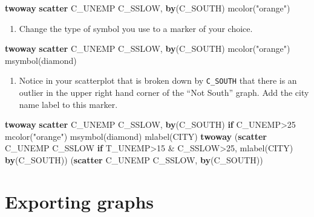 \documentclass[
]{book}
\newenvironment{Shaded}{\begin{snugshade}}{\end{snugshade}}
\newcommand{\BaseNTok}[1]{\textcolor[rgb]{0.00,0.00,0.81}{#1}}
\newcommand{\KeywordTok}[1]{\textcolor[rgb]{0.13,0.29,0.53}{\textbf{#1}}}
\newcommand{\NormalTok}[1]{#1}
\newcommand{\StringTok}[1]{\textcolor[rgb]{0.31,0.60,0.02}{#1}}
\providecommand{\tightlist}{%
  \setlength{\itemsep}{0pt}\setlength{\parskip}{0pt}}
\begin{document}
\begin{Shaded}
\begin{Highlighting}[]
\KeywordTok{twoway} \KeywordTok{scatter}\NormalTok{ C\_UNEMP C\_SSLOW, }\KeywordTok{by}\NormalTok{(C\_SOUTH) mcolor(}\StringTok{"orange"}\NormalTok{)}
\end{Highlighting}
\end{Shaded}

\begin{enumerate}
\def\labelenumi{\arabic{enumi}.}
\setcounter{enumi}{4}
\tightlist
\item
  Change the type of symbol you use to a marker of your choice.
\end{enumerate}

\begin{Shaded}
\begin{Highlighting}[]
\KeywordTok{twoway} \KeywordTok{scatter}\NormalTok{ C\_UNEMP C\_SSLOW, }\KeywordTok{by}\NormalTok{(C\_SOUTH) mcolor(}\StringTok{"orange"}\NormalTok{) }\BaseNTok{msymbol}\NormalTok{(diamond)}
\end{Highlighting}
\end{Shaded}

\begin{enumerate}
\def\labelenumi{\arabic{enumi}.}
\setcounter{enumi}{5}
\tightlist
\item
  Notice in your scatterplot that is broken down by \texttt{C\_SOUTH} that there is an outlier in the upper right hand corner of the ``Not South'' graph. Add the city name label to this marker.
\end{enumerate}

\begin{Shaded}
\begin{Highlighting}[]
\KeywordTok{twoway} \KeywordTok{scatter}\NormalTok{ C\_UNEMP C\_SSLOW, }\KeywordTok{by}\NormalTok{(C\_SOUTH) }\KeywordTok{if}\NormalTok{ C\_UNEMP\textgreater{}25 mcolor(}\StringTok{"orange"}\NormalTok{) }\BaseNTok{msymbol}\NormalTok{(diamond) }\BaseNTok{mlabel}\NormalTok{(CITY)}
\KeywordTok{twoway}\NormalTok{ (}\KeywordTok{scatter}\NormalTok{ C\_UNEMP C\_SSLOW }\KeywordTok{if}\NormalTok{ T\_UNEMP\textgreater{}15 \& C\_SSLOW\textgreater{}25, }\BaseNTok{mlabel}\NormalTok{(CITY) }\KeywordTok{by}\NormalTok{(C\_SOUTH)) (}\KeywordTok{scatter}\NormalTok{ C\_UNEMP C\_SSLOW, }\KeywordTok{by}\NormalTok{(C\_SOUTH))}
\end{Highlighting}
\end{Shaded}

\hypertarget{exporting-graphs}{%
\section{Exporting graphs}\label{exporting-graphs}}
\end{document}
